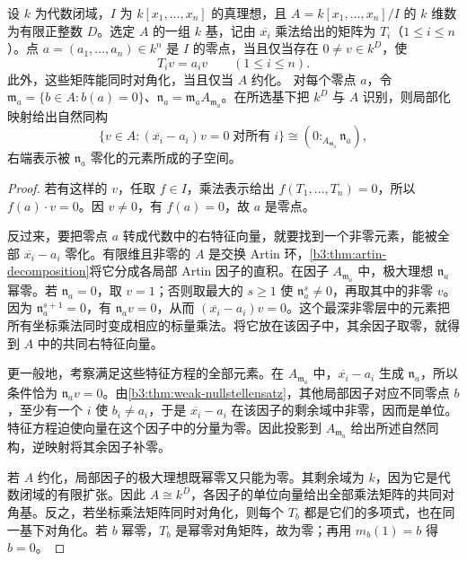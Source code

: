 \begin{theorem}[乘法矩阵与共同特征值]\label{b3:thm:multiplication-joint-eigenvalues}
	设 \(k\) 为代数闭域，\(I\) 为 \(k[x_1,\ldots,x_n]\) 的真理想，且 \(A=k[x_1,\ldots,x_n]/I\) 的 \(k\) 维数为有限正整数 \(D\)。选定 \(A\) 的一组 \(k\) 基，记由 \(\overline{x_i}\) 乘法给出的矩阵为 \(T_i\)（\(1\le i\le n\)）。点 \(a=(a_1,\ldots,a_n)\in k^n\) 是 \(I\) 的零点，当且仅当存在 \(0\ne v\in k^D\)，使
	\[
		T_i v=a_i v\qquad(1\le i\le n).
	\]
	此外，这些矩阵能同时对角化，当且仅当 \(A\) 约化。 对每个零点 \(a\)，令 \(\mathfrak m_a=\{b\in A:b(a)=0\}\)、\(\mathfrak n_a=\mathfrak m_aA_{\mathfrak m_a}\)。在所选基下把 \(k^D\) 与 \(A\) 识别，则局部化映射给出自然同构
	\[
		\{v\in A:(\overline{x_i}-a_i)v=0\;\text{对所有}\;i\} \cong (0:_{A_{\mathfrak m_a}}\mathfrak n_a),
	\]
	右端表示被 \(\mathfrak n_a\) 零化的元素所成的子空间。
\end{theorem}
\begin{proof}
	若有这样的 \(v\)，任取 \(f\in I\)，乘法表示给出 \(f(T_1,\ldots,T_n)=0\)，所以 \(f(a)\cdot v=0\)。因 \(v\ne0\)，有 \(f(a)=0\)，故 \(a\) 是零点。

	反过来，要把零点 \(a\) 转成代数中的右特征向量，就要找到一个非零元素，能被全部 \(\overline{x_i}-a_i\) 零化。有限维且非零的 \(A\) 是交换 Artin 环，\cref{b3:thm:artin-decomposition}将它分成各局部 Artin 因子的直积。在因子 \(A_{\mathfrak m_a}\) 中，极大理想 \(\mathfrak n_a\) 幂零。若 \(\mathfrak n_a=0\)，取 \(v=1\)；否则取最大的 \(s\ge1\) 使 \(\mathfrak n_a^s\ne0\)，再取其中的非零 \(v\)。因为 \(\mathfrak n_a^{s+1}=0\)，有 \(\mathfrak n_av=0\)，从而 \((\overline{x_i}-a_i)v=0\)。这个最深非零层中的元素把所有坐标乘法同时变成相应的标量乘法。将它放在该因子中，其余因子取零，就得到 \(A\) 中的共同右特征向量。

	更一般地，考察满足这些特征方程的全部元素。在 \(A_{\mathfrak m_a}\) 中，\(\overline{x_i}-a_i\) 生成 \(\mathfrak n_a\)，所以条件恰为 \(\mathfrak n_av=0\)。由\cref{b3:thm:weak-nullstellensatz}，其他局部因子对应不同零点 \(b\)，至少有一个 \(i\) 使 \(b_i\ne a_i\)，于是 \(\overline{x_i}-a_i\) 在该因子的剩余域中非零，因而是单位。特征方程迫使向量在这个因子中的分量为零。因此投影到 \(A_{\mathfrak m_a}\) 给出所述自然同构，逆映射将其余因子补零。

	若 \(A\) 约化，局部因子的极大理想既幂零又只能为零。其剩余域为 \(k\)，因为它是代数闭域的有限扩张。因此 \(A\cong k^D\)，各因子的单位向量给出全部乘法矩阵的共同对角基。反之，若坐标乘法矩阵同时对角化，则每个 \(T_b\) 都是它们的多项式，也在同一基下对角化。若 \(b\) 幂零，\(T_b\) 是幂零对角矩阵，故为零；再用 \(m_b(1)=b\) 得 \(b=0\)。
\end{proof}

